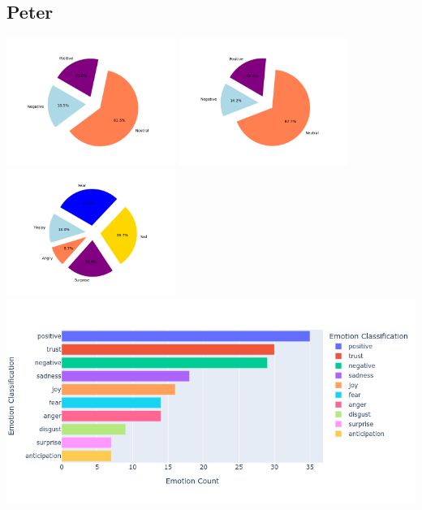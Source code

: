 \documentclass[a4paper,12pt]{article}
\begin{document}
	\subsection{Peter}
	\begin{center}	
		{\includegraphics[width=5.5cm]{petersVaderEmotionalPie.png}}
		{\includegraphics[width=5.5cm]{petersBlobEmotionalPie.png}}
		{\includegraphics[width=5.5cm]{petersEmotionalPie.png}}\\
		{\includegraphics[width=16cm]{peterNrcImage.png}}\\
	\end{center}
	\clearpage
\end{document}
